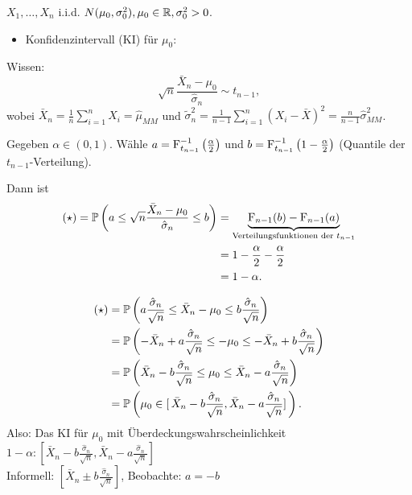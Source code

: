 \documentclass{tstextbook}
\begin{document}
\begin{example}[Normalverteilung]
	$ X_1, \ldots, X_n $ i.i.d. $ N(\mu_0, \sigma_0^2), \mu_0 \in \mathbb R, \sigma_0^2 > 0 $. 
	
	
	\begin{itemize} \item Konfidenzintervall (KI) für $ \mu_0 $: \end{itemize}
	
	
	Wissen: \[\sqrt{n}\frac{\bar{X}_n-\mu_0}{\hat{\sigma}_n} \sim t_{n-1},\] 
	wobei $ \bar{X}_n = \frac{1}{n}\sum_{i=1}^{n} X_i = \hat{\mu}_{MM} $ und $ \tilde{\sigma}_n^2 = \frac{1}{n-1} \sum_{i=1}^{n} (X_i-\bar{X})^2 = \frac{n}{n-1}\hat{\sigma}_{MM}^2 $.
	
	Gegeben $ \alpha \in (0,1) $. Wähle $ a = \operatorname{F}_{t_{n-1}}^{-1} \left(\frac{\alpha}{2}\right) $ und $ b = \operatorname{F}_{t_{n-1}}^{-1} \left(1-\frac{\alpha}{2}\right) $ (Quantile der $ t_{n-1} $-Verteilung).
	
	Dann ist 
	\[
	\begin{aligned}
		(\star) = \mathbb P\left(a\le\sqrt{n}\frac{\bar{X}_n-\mu_0}{\hat{\sigma}_n} \le b \right) & = \underbrace{ \operatorname{F}_{{n-1}}(b) - \operatorname{F}_{{n-1}}(a)}_{\text{Verteilungsfunktionen der } t_{n-1} } \\
		& = 1 - \frac{\alpha}{2} - \frac{\alpha}{2} \\
		& = 1 - \alpha.
	\end{aligned}
	\]
	
	\[
	\begin{aligned}
		(\star) & = \mathbb P\left(a\frac{\hat{\sigma}_n}{\sqrt{n}} \le \bar{X}_n - \mu_0 \le b\frac{\hat{\sigma}_n}{\sqrt{n}} \right) \\
		& = \mathbb P\left(- \bar{X}_n + a\frac{\hat{\sigma}_n}{\sqrt{n}} \le - \mu_0 \le - \bar{X}_n + b\frac{\hat{\sigma}_n}{\sqrt{n}} \right) \\
		& = \mathbb P\left(\bar{X}_n - b\frac{\hat{\sigma}_n}{\sqrt{n}} \le \mu_0 \le \bar{X}_n -a\frac{\hat{\sigma}_n}{\sqrt{n}} \right) \\
		& = \mathbb P\left(\mu_0 \in [ \, \bar{X}_n - b\frac{\hat{\sigma}_n}{\sqrt{n}}  , \bar{X}_n - a\frac{\hat{\sigma}_n}{\sqrt{n}} ] \,  \right).
	\end{aligned}
	\]
	Also: Das KI für $\mu_0$ mit Überdeckungswahrscheinlichkeit $1-\alpha :  \left[\bar{X}_n-b\frac{\hat{\sigma}_n}{\sqrt{n}}, \bar{X}_n-a\frac{\hat{\sigma}_n}{\sqrt{n}} \right] $ \\
	Informell: $\left[\bar{X}_n \pm b\frac{\hat{\sigma}_n}{\sqrt{n}} \right] $, Beobachte: $ a=-b$ \\
	

\end{example}
\end{document}
